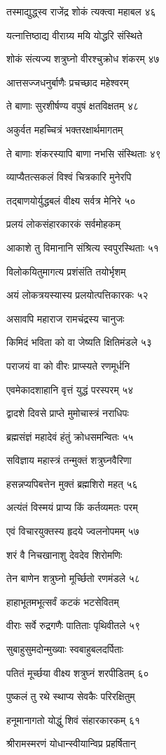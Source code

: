 तस्माद्युद्ध्स्व राजेंद्र शोकं त्यक्त्वा महाबल ४६

यत्नात्तिष्ठाद्य वीराग्र्य मयि योद्धरि संस्थिते

शोकं संत्यज्य शत्रुघ्नो वीरश्चुक्रोध शंकरम् ४७

आत्तसज्जधनुर्बाणैः प्रचच्छाद महेश्वरम्

ते बाणाः सुरशीर्षण्य वपुषं क्षतविक्षतम् ४८

अकुर्वत महच्चित्रं भक्तरक्षार्थमागतम्

ते बाणाः शंकरस्यापि बाणा नभसि संस्थिताः ४९

व्याप्यैतत्सकलं विश्वं चित्रकारि मुनेरपि

तद्बाणयोर्युद्धबलं वीक्ष्य सर्वत्र मेनिरे ५०

प्रलयं लोकसंहारकारकं सर्वमोहकम्

आकाशे तु विमानानि संश्रित्य स्वपुरस्थिताः ५१

विलोकयितुमागत्य प्रशंसंति तयोर्भृशम्

अयं लोकत्रयस्यास्य प्रलयोत्पत्तिकारकः ५२

असावपि महाराज रामचंद्रस्य चानुजः

किमिदं भविता को वा जेष्यति क्षितिमंडले ५३

पराजयं वा को वीरः प्राप्स्यते रणमूर्धनि

एवमेकादशाहानि वृत्तं युद्धं परस्परम् ५४

द्वादशे दिवसे प्राप्ते मुमोचास्त्रं नराधिपः

ब्रह्मसंज्ञं महादेवं हंतुं क्रोधसमन्वितः ५५

सविज्ञाय महास्त्रं तन्मुक्तं शत्रुघ्नवैरिणा

हसन्नप्यपिबत्तेन मुक्तं ब्रह्मशिरो महत् ५६

अत्यंतं विस्मयं प्राप्य किं कर्तव्यमतः परम्

एवं विचारयुक्तस्य हृदये ज्वलनोपमम् ५७

शरं वै निचखानाशु देवदेव शिरोमणिः

तेन बाणेन शत्रुघ्नो मूर्च्छितो रणमंडले ५८

हाहाभूतमभूत्सर्वं कटकं भटसेवितम्

वीराः सर्वे रुद्रगणैः पातिताः पृथिवीतले ५९

सुबाहुसुमदोन्मुख्याः स्वबाहुबलदर्पिताः

पतितं मूर्च्छया वीक्ष्य शत्रुघ्नं शरपीडितम् ६०

पुष्कलं तु रथे स्थाप्य सेवकैः परिरक्षितुम्

हनूमानागतो योद्धुं शिवं संहारकारकम् ६१

श्रीरामस्मरणं योधान्स्वीयान्विप्र प्रहर्षितान्


